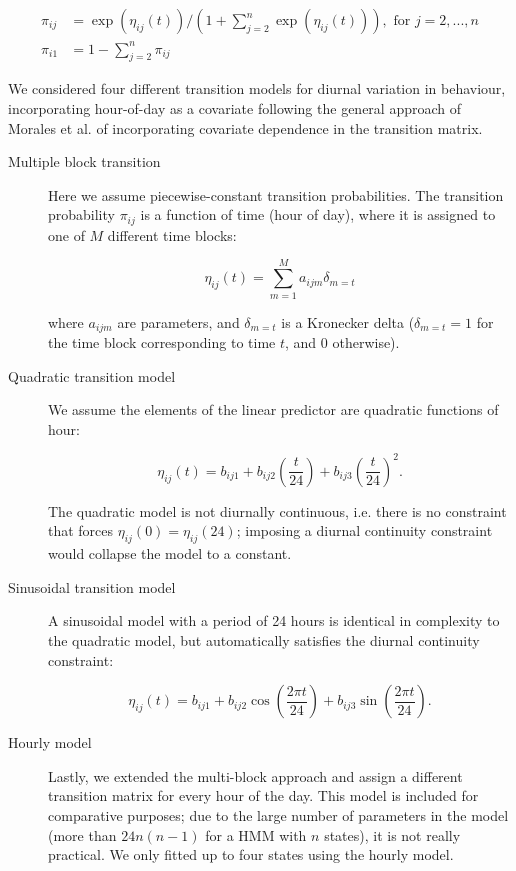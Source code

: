 \documentclass{bmcart}
\begin{document}
\begin{equation}
\begin{split}
\pi_{ij} & = \exp(\eta_{ij}(t))/\left(1+\sum_{j=2}^{n}\exp(\eta_{ij}(t))\right), \textrm{ for } j={2,...,n} \\
\pi_{i1} & = 1 - \sum_{j=2}^{n}\pi_{ij}
\end{split}
\end{equation}

We considered four different transition models for diurnal variation in behaviour, incorporating 
hour-of-day as a covariate following the general approach of Morales et al. 
\cite{morales_extracting_2004} of incorporating covariate dependence in the transition matrix.

\begin{description}

\item[Multiple block transition] Here we assume piecewise-constant transition probabilities. The transition probability $\pi_{ij}$ is a function of time (hour of day), where it is assigned to one of $M$ different time blocks:

$$
\eta_{ij}(t) = \sum_{m=1}^{M}a_{ijm} \delta_{m=t}
$$

where $a_{ijm}$ are parameters, and $\delta_{m=t}$ is a Kronecker delta ($\delta_{m=t}=1$ for the time block corresponding to time $t$, and 0 otherwise). 

\item[Quadratic transition model] 
We assume the elements of the linear predictor
are quadratic functions of hour: 

$$
\eta_{ij}(t) = b_{ij1}+b_{ij2}\left(\frac{t}{24}\right)+b_{ij3}\left(\frac{t}{24}\right)^{2} .
$$

The quadratic model is not diurnally continuous, i.e. there 
is no constraint that forces $\eta_{ij}(0)=\eta_{ij}(24)$; imposing a diurnal continuity 
constraint would collapse the model to a constant.

\item[Sinusoidal transition model] A sinusoidal model with a period of 24 hours is identical in complexity to the quadratic model, but automatically satisfies the diurnal continuity constraint:

$$
\eta_{ij}(t)= b_{ij1}+b_{ij2}\cos\left(\frac{2\pi t}{24}\right)+b_{ij3}\sin\left(\frac{2\pi t}{24}\right) .
$$

\item[Hourly model] Lastly, we extended the multi-block approach and assign  a different 
transition matrix for every hour of the day. This model is included for comparative purposes; due 
to the large number of parameters in the model (more than $24n(n-1)$ for a HMM with $n$ states), 
it is not really practical. We only fitted up to four states using the hourly model.  
\end{description}
\end{document}
